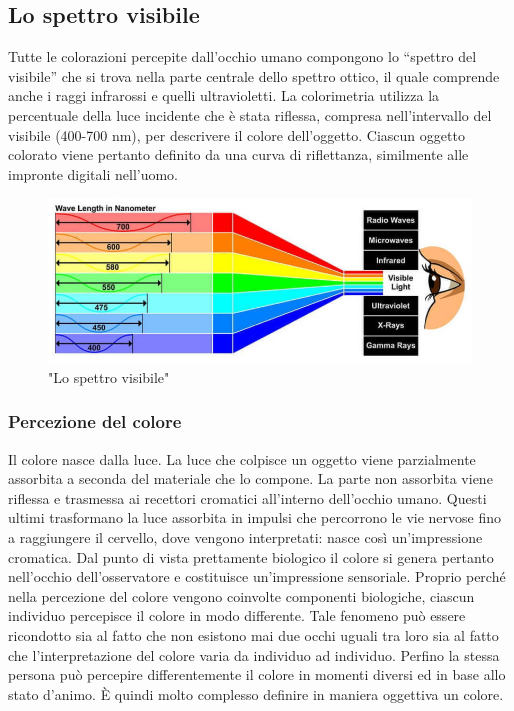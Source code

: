 \documentclass[a4paper,11pt]{article}
\begin{document}
        \subsection{Lo spettro visibile}
        Tutte le colorazioni percepite dall’occhio umano compongono lo “spettro del visibile” che si trova nella parte centrale dello spettro ottico, il quale
        comprende anche i raggi infrarossi e quelli ultravioletti. 
        La colorimetria utilizza la percentuale della luce incidente che è stata riflessa, compresa
        nell'intervallo del visibile (400-700 nm), per descrivere il colore dell'oggetto. Ciascun oggetto
        colorato viene pertanto definito da una curva di riflettanza, similmente alle impronte digitali
        nell’uomo. 
        \begin{figure}[h]
            \centering
            \includegraphics[scale=0.45]{colorimetria3}
            \caption{"Lo spettro visibile"}
        \end{figure}
        \newpage
        \subsubsection{Percezione del colore}
        Il colore nasce dalla luce. La luce che colpisce un oggetto viene parzialmente assorbita a
        seconda del materiale che lo compone. La parte non assorbita viene riflessa e trasmessa ai recettori cromatici
        all’interno dell’occhio umano. Questi ultimi trasformano la luce assorbita in impulsi che
        percorrono le vie nervose fino a raggiungere il cervello, dove vengono interpretati: nasce così
        un’impressione cromatica. Dal punto di vista prettamente biologico il colore si genera pertanto
        nell’occhio dell’osservatore e costituisce un’impressione sensoriale.
        Proprio perché nella percezione del colore vengono coinvolte componenti biologiche, ciascun individuo percepisce il colore in modo
        differente. Tale fenomeno può essere ricondotto sia al fatto che non esistono mai due occhi
        uguali tra loro sia al fatto che l’interpretazione del colore varia da individuo ad individuo.
        Perfino la stessa persona può percepire differentemente il colore in momenti diversi ed in base
        allo stato d’animo. È quindi molto complesso definire in maniera oggettiva un colore.
\end{document}
